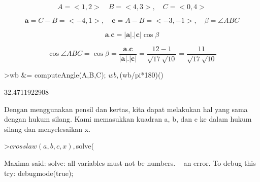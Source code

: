 \documentclass[a4paper,10pt]{article}
\begin{document}
\begin{eulernotebook}
\begin{eulercomment}
\begin{eulercomment}
\begin{eulercomment}
\begin{eulercomment}
\begin{eulercomment}
\begin{eulercomment}
\begin{eulercomment}
\begin{eulercomment}
\begin{eulercomment}
\begin{eulercomment}
\begin{eulercomment}
\begin{eulercomment}
\begin{eulercomment}
\begin{eulercomment}
\begin{eulercomment}
\begin{eulercomment}
\begin{eulercomment}
\end{eulercomment}
\begin{eulerformula}
\[
A=<1,2>\quad B=<4,3>,\quad C=<0,4>
\]
\end{eulerformula}
\begin{eulerformula}
\[
\mathbf{a}=C-B=<-4,1>,\quad \mathbf{c}=A-B=<-3,-1>,\quad \beta=\angle ABC
\]
\end{eulerformula}
\begin{eulerformula}
\[
\mathbf{a}.\mathbf{c}=|\mathbf{a}|.|\mathbf{c}|\cos \beta
\]
\end{eulerformula}
\begin{eulerformula}
\[
\cos \angle ABC =\cos\beta=\frac{\mathbf{a}.\mathbf{c}}{|\mathbf{a}|.|\mathbf{c}|}=\frac{12-1}{\sqrt{17}\sqrt{10}}=\frac{11}{\sqrt{17}\sqrt{10}}
\]
\end{eulerformula}
\begin{eulerprompt}
>wb &= computeAngle(A,B,C); $wb, $(wb/pi*180)()
\end{eulerprompt}
\begin{euleroutput}
  32.4711922908
\end{euleroutput}
\begin{eulercomment}
Dengan menggunakan pensil dan kertas, kita dapat melakukan hal yang
sama dengan hukum silang. Kami memasukkan kuadran a, b, dan c ke dalam
hukum silang dan menyelesaikan x.
\end{eulercomment}
\begin{eulerprompt}
>$crosslaw(a,b,c,x), $solve(%
\end{eulerprompt}
\begin{euleroutput}
  Maxima said:
  solve: all variables must not be numbers.
   -- an error. To debug this try: debugmode(true);
  

\end{euleroutput}
\end{eulercomment}
\end{eulercomment}
\end{eulercomment}
\end{eulercomment}
\end{eulercomment}
\end{eulercomment}
\end{eulercomment}
\end{eulercomment}
\end{eulercomment}
\end{eulercomment}
\end{eulercomment}
\end{eulercomment}
\end{eulercomment}
\end{eulercomment}
\end{eulercomment}
\end{eulercomment}
\end{eulernotebook}
\end{document}
